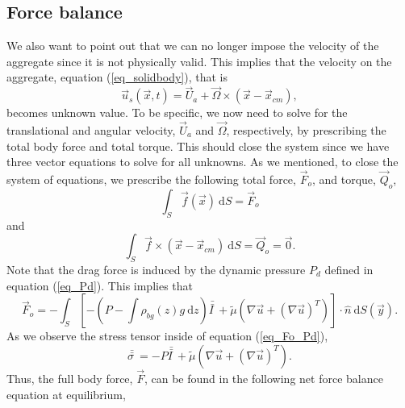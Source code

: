 \subsection{Force balance}
\label{sec:force_balance}
\par
We also want to point out that we can no longer impose the velocity of the aggregate since it is not physically valid.
This implies that the velocity on the aggregate, equation (\ref{eq_solidbody}), that is
\begin{equation}
	\vec{u}_s (\vec{x}, t)  = \vec{U}_a + \vec{\Omega} \times (\vec{x}- \vec{x}_{cm}),
	\nonumber
\end{equation}
becomes unknown value. To be specific, we now need to solve for the translational and angular velocity, $\vec{U}_a$ and $\vec{\Omega}$, respectively, by prescribing the total body force and total torque. 
This should close the system since we have three vector equations to solve for all unknowns. 
As we mentioned, to close the system of equations, we prescribe the following total force, $\vec{F}_o$, and torque, $\vec{Q}_o $,
\begin{equation}
	\int_S \vec{f} (\vec{x}) \ \textrm{d}S = \vec{F}_o
\label{eq_Fo}
\end{equation}
and
\begin{equation}
	\int_S \vec{f}\times (\vec{x} - \vec{x}_{cm}) \ \textrm{d}S = \vec{Q}_o = \vec{0}.
\label{eq_Qo}
\end{equation}
 Note that the drag force is induced by the dynamic pressure $P_d$ defined in equation (\ref{eq_Pd}). This implies that 
\begin{equation}
	\vec{F}_o 
	 = - \int_S \left[ 
	 - \left( P -  \int \rho_{bg}(z) g \ \textrm{d}z \right) \bar{\bar{I \ }} 
	 + \tilde{\mu} \left( \nabla \vec{u} + (\nabla \vec{u})^{T} \right)
	 \right] \cdot \hat{n} \ \textrm{d}S (\vec{y}).
\label{eq_Fo_Pd}
\end{equation}
As we observe the stress tensor inside of equation (\ref{eq_Fo_Pd}), 
\begin{equation}
	\bar{\bar{\sigma \ }} = 
 -  P  \bar{\bar{I \ }} 
 + \tilde{\mu} \left( \nabla \vec{u} + (\nabla \vec{u})^{T} \right).
\end{equation}
Thus, the full body force, $\vec{F}$, can be found in the following net force balance equation at equilibrium,
